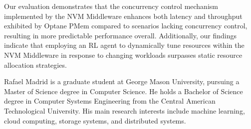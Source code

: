 \documentclass[11pt]{report}
\begin{document}
Our evaluation demonstrates that the concurrency control mechanism implemented by the NVM Middleware enhances both latency and throughput exhibited by Optane PMem compared to scenarios lacking concurrency control, resulting in more predictable performance overall. Additionally, our findings indicate that employing an RL agent to dynamically tune resources within the NVM Middleware in response to changing workloads surpasses static resource allocation strategies.

\startofchapters









\appendix
\appendixeqnumbering
% 
% 
% 
% 
% 






\biography

\noindent Rafael Madrid is a graduate student at George Mason University, pursuing a Master of Science degree in Computer Science. He holds a Bachelor of Science degree in Computer Systems Engineering from the Central American Technological University. His main research interests include machine learning, cloud computing, storage systems, and distributed systems. 
\end{document}
